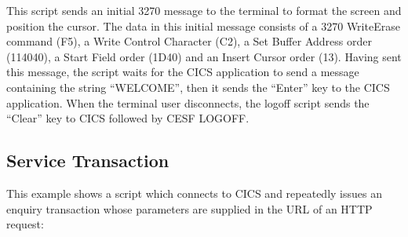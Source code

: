 \documentclass[letterpaper,10pt,english]{sphinxmanual}
\begin{document}
\sphinxAtStartPar
{}

\sphinxAtStartPar
This script sends an initial 3270 message to the terminal to format the screen and position the cursor. The data in this initial message consists of a 3270 Write\sphinxhyphen{}Erase command (F5), a Write Control Character (C2), a Set Buffer Address order (114040), a Start Field order (1D40) and an Insert Cursor order (13). Having sent this message, the script waits for the CICS application to send a message containing the string “WELCOME”, then it sends the “Enter” key to the CICS application. When the terminal user disconnects, the logoff script sends the “Clear” key to CICS followed by CESF LOGOFF.

\ignorespaces 

\subsection{Service Transaction}
\label{\detokenize{connectivity_guide:service-transaction}}\label{\detokenize{connectivity_guide:index-128}}
\sphinxAtStartPar
This example shows a script which connects to CICS and repeatedly issues an enquiry transaction whose parameters are supplied in the URL of an HTTP request:
\end{document}
